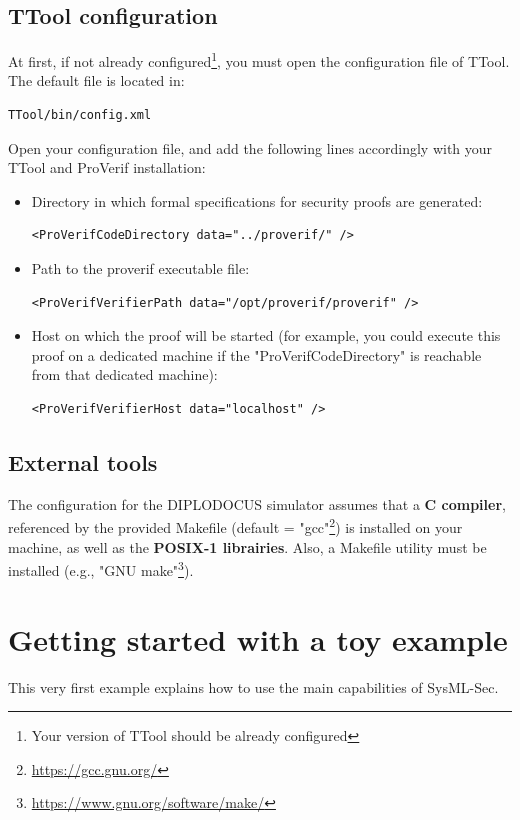 \documentclass[12pt]{article}
\begin{document}
\subsection{TTool configuration}
At first, if not already configured\footnote{Your version of TTool should be already configured}, you must open the configuration file of TTool. The default file is located in:
\begin{verbatim}
TTool/bin/config.xml
\end{verbatim}
Open your configuration file, and add the following lines accordingly with your TTool and ProVerif installation:
\begin{itemize}
\item Directory in which formal specifications for security proofs are generated:
\begin{verbatim}
<ProVerifCodeDirectory data="../proverif/" />
\end{verbatim}
\item Path to the proverif executable file:
\begin{verbatim}
<ProVerifVerifierPath data="/opt/proverif/proverif" />
\end{verbatim}
\item Host on which the proof will be started (for example, you could execute this proof on a dedicated machine if the "ProVerifCodeDirectory" is reachable from that dedicated machine):
\begin{verbatim}
<ProVerifVerifierHost data="localhost" />
\end{verbatim}
\end{itemize}


\subsection{External tools}
The  configuration for the DIPLODOCUS simulator assumes that a \textbf{C compiler}, referenced by the provided Makefile (default = "gcc"\footnote{\url{https://gcc.gnu.org/}}) is installed on your machine, as well as the \textbf{POSIX-1 librairies}. Also, a Makefile utility must be installed (e.g., "GNU make"\footnote{\url{https://www.gnu.org/software/make/}}).

\newpage
\section{Getting started with a toy example}\label{sec:example}
This very first example explains how to use the main capabilities of SysML-Sec.
\end{document}
